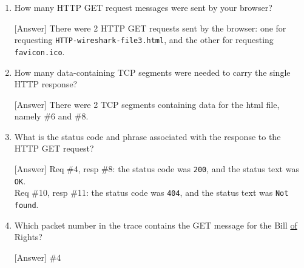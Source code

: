 \documentclass{homework}
\begin{document}
\begin{enumerate}[label={(\arabic*)}]
  \item How many HTTP GET request messages were sent by your browser?
  
  \textsf{[Answer]} There were 2 HTTP GET requests sent by the browser: one for requesting \texttt{HTTP-wireshark-file3.html}, and the other for requesting \texttt{favicon.ico}.

  \item How many data-containing TCP segments were needed to carry the single HTTP response?
  
  \textsf{[Answer]} There were 2 TCP segments containing data for the html file, namely \#6 and \#8.

  \item What is the status code and phrase associated with the response to the HTTP GET request?
  
  \textsf{[Answer]} Req \#4, resp \#8: the status code was \texttt{200}, and the status text was \texttt{OK}. \\
  Req \#10, resp \#11: the status code was \texttt{404}, and the status text was \texttt{Not found}.

  \item Which packet number in the trace contains the GET message for the Bill \underline{of} Rights?
  
  \textsf{[Answer]} \#4

  \newpage


\end{enumerate}
\end{document}
